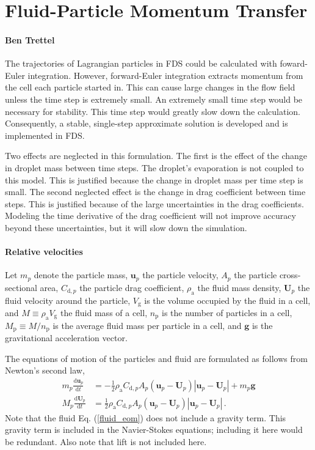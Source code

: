 \chapter{Fluid-Particle Momentum Transfer}
\subsubsection{Ben Trettel}

The trajectories of Lagrangian particles in FDS could be calculated with foward-Euler integration. However, forward-Euler integration extracts momentum from the cell each particle started in. This can cause large changes in the flow field unless the time step is extremely small. An extremely small time step would be necessary for stability. This time step would greatly slow down the calculation. Consequently, a stable, single-step approximate solution is developed and is implemented in FDS.

Two effects are neglected in this formulation. The first is the effect of the change in droplet mass between  time steps. The droplet's evaporation is not coupled to this model. This is justified because the change in droplet mass per time step is small. The second neglected effect is the change in drag coefficient between time steps. This is justified because of the large uncertainties in the drag coefficients. Modeling the time derivative of the drag coefficient will not improve accuracy beyond these uncertainties, but it will slow down the simulation.

\subsubsection{Relative velocities}
Let $m_p$ denote the particle mass, $\mathbf{u}_p$ the particle velocity, $A_p$ the particle cross-sectional area, $C_{\text{d},p}$ the particle drag coefficient, $\rho_\text{a}$ the fluid mass density, $\mathbf{U}_p$ the fluid velocity around the particle, $V_\text{g}$ is the volume occupied by the fluid in a cell, and $M \equiv \rho_\text{a} V_\text{g}$ the fluid mass of a cell, $n_\text{p}$ is the number of particles in a cell, $M_\text{p} \equiv M/n_\text{p}$ is the average fluid mass per particle in a cell, and $\mathbf{g}$ is the gravitational acceleration vector.

The equations of motion of the particles and fluid are formulated as follows from Newton's second law,
\begin{align}
    \label{particle_eom}
    m_p \frac{\text{d} \mathbf{u}_p}{\text{d} t} &= - \frac{1}{2} \rho_\text{a} C_{\text{d},p} A_p (\mathbf{u}_p - \mathbf{U}_p) |\mathbf{u}_p - \mathbf{U}_p| + m_p \mathbf{g} \\
    \label{fluid_eom}
    M_p \frac{\text{d} \mathbf{U}_p}{\text{d} t} &= \frac{1}{2} \rho_\text{a} C_{\text{d},p} A_p (\mathbf{u}_p - \mathbf{U}_p) |\mathbf{u}_p - \mathbf{U}_p| \,.
\end{align}
Note that the fluid Eq. (\ref{fluid_eom}) does not include a gravity term. This gravity term is included in the Navier-Stokes equations; including it here would be redundant. Also note that lift is not included here.

